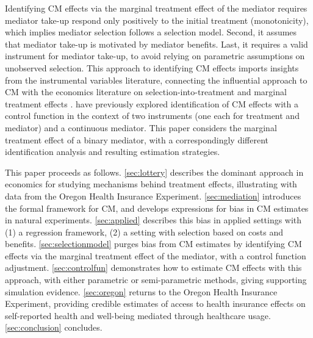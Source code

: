 Identifying CM effects via the marginal treatment effect of the mediator requires mediator take-up respond only positively to the initial treatment (monotonicity), which implies mediator selection follows a selection model.
Second, it assumes that mediator take-up is motivated by mediator benefits.
Last, it requires a valid instrument for mediator take-up, to avoid relying on parametric assumptions on unobserved selection.
This approach to identifying CM effects imports insights from the instrumental variables literature, connecting the influential \cite{imai2010identification} approach to CM with the economics literature on selection-into-treatment and marginal treatment effects \citep{vytlacil2002independence,heckman2004using,heckman2005structural,florens2008identification,kline2019heckits}.
\cite{frolich2017direct} have previously explored identification of CM effects with a control function in the context of two instruments (one each for treatment and mediator) and a continuous mediator.
This paper considers the marginal treatment effect of a binary mediator, with a correspondingly different identification analysis and resulting estimation strategies.

This paper proceeds as follows.
\autoref{sec:lottery} describes the dominant approach in economics for studying mechanisms behind treatment effects, illustrating with data from the Oregon Health Insurance Experiment.
\autoref{sec:mediation} introduces the formal framework for CM, and develops expressions for bias in CM estimates in natural experiments.
\autoref{sec:applied} describes this bias in applied settings with (1) a regression framework, (2) a setting with selection based on costs and benefits.
\autoref{sec:selectionmodel} purges bias from CM estimates by identifying CM effects via the marginal treatment effect of the mediator, with a control function adjustment.
\autoref{sec:controlfun} demonstrates how to estimate CM effects with this approach, with either parametric or semi-parametric methods, giving supporting simulation evidence.
\autoref{sec:oregon} returns to the Oregon Health Insurance Experiment, providing credible estimates of access to health insurance effects on self-reported health and well-being mediated through healthcare usage.
\autoref{sec:conclusion} concludes.
